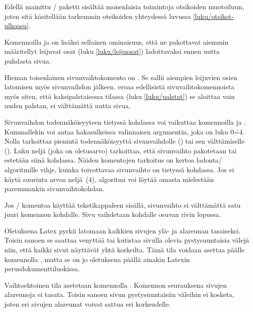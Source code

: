 Edellä mainittu \-/ paketti sisältää monenlaisia
toimintoja otsikoiden muotoiluun, joten sitä käsitellään tarkemmin
otsikoiden yhteydessä luvussa \ref{luku/otsikot-ulkoasu}.

Komennoilla  ja  on lisäksi
sellainen ominaisuus, että ne pakottavat aiemmin määritellyt leijuvat
osat (luku \ref{luku/leijuosat}) ladottavaksi ennen uutta puhdasta
sivua.

Hieman toisenlainen sivunvaihtokomento on . Se sallii
aiempien leijuvien osien latomisen myös sivunvaihdon jälkeen.
 eroaa edellisistä sivuvaihtokomennoista myös siten,
että kaksipalstaisessa tilassa (luku \ref{luku/palstat}) se aloittaa
vain uuden palstan, ei välttämättä uutta sivua.

Sivunvaihdon todennäköisyyteen tietyssä kohdassa voi vaikuttaa
komennoilla  ja . Kummallekin
voi antaa hakasulkeissa valinnaisen argumentin, joka on luku 0\==4.
Nolla tarkoittaa pienintä todennäköisyyttä sivunvaihdolle
() tai sen välttämiselle
(). Luku neljä (joka on oletusarvo)
tarkoittaa, että sivunvaihto pakotetaan tai estetään siinä kohdassa.
Näiden komentojen tarkoitus on kertoa ladonta\-/ algoritmille vihje,
kuinka toivottavaa sivunvaihto on tietyssä kohdassa. Jos ei käytä
suurinta arvoa neljä~(4), algoritmi voi löytää omasta mielestään
paremmankin sivunvaihtokohdan.

\begin{koodilohkosis}
\pagebreak[3]  %
\nopagebreak   %
\end{koodilohkosis}

Jos \-/ komentoa käyttää tekstikappaleen sisällä,
sivunvaihto ei välttämättä satu juuri komennon kohdalle. Sivu vaihdetaan
kohdalle osuvan rivin lopussa.

Oletuksena Latex pyrkii latomaan kaikkien sivujen ylä- ja alareunan
tasaiseksi. Toisin sanoen se saattaa venyttää tai kutistaa sivulla
olevia pystysuuntaisia välejä niin, että kaikki sivut näyttävät yhtä
korkeilta. Tämä tila voidaan asettaa päälle komennolla
, mutta se on jo oletuksena päällä ainakin Latexin
perusdokumenttiluokissa.

Vaihtoehtoinen tila asetetaan komennolla .
Komennon seurauksena sivujen alareunoja ei tasata. Toisin sanoen sivun
pystysuuntaisiin väleihin ei kosketa, joten eri sivujen alareunat voivat
sattua eri korkeudelle.


